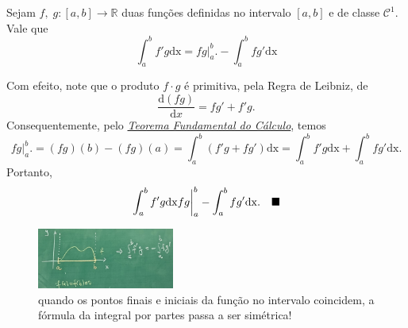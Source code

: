 \documentclass[../analysisII_notes.tex]{subfiles}
\begin{document}
\hypertarget{integration_by_parts}{\begin{theorem*}
		Sejam \(f,\;g:[a, b]\rightarrow \mathbb{R}\) duas funções definidas no intervalo \([a, b]\) e de classe \(\mathcal{C}^{1}\). Vale que
		\[
			\int_{a}^{b}f'g \mathrm{dx} = fg \biggl|_{a}^{b}\biggr. - \int_{a}^{b}fg' \mathrm{dx}
		\]
	\end{theorem*}}
\begin{proof*}
	Com efeito, note que o produto \(f \cdot g\) é primitiva, pela Regra de Leibniz, de
	\[
		\frac{\mathrm{d}(fg)}{\mathrm{d}x} = fg' + f'g.
	\]
	Consequentemente, pelo \hyperlink{ftc}{\textit{Teorema Fundamental do Cálculo}}, temos
	\[
		fg \biggl|_{a}^{b}\biggr. = (fg)(b)-(fg)(a) = \int_{a}^{b}(f'g+fg') \mathrm{dx} = \int_{a}^{b}f'g \mathrm{dx} + \int_{a}^{b}fg' \mathrm{dx}.
	\]
	Portanto,
	\[
		\int_{a}^{b}f'g \mathrm{dx}fg \biggl|_{a}^{b}\biggr. - \int_{a}^{b}fg' \mathrm{dx}. \quad \text{$\blacksquare$}
	\]
\end{proof*}
\begin{figure}[H]
	\begin{center}
		\includegraphics[height=0.4\textheight, width=0.4\textwidth, keepaspectratio]{./Images/integral_by_parts_15.png}
	\end{center}
	\caption{quando os pontos finais e iniciais da função no intervalo coincidem, a fórmula da integral por partes passa a ser simétrica!}
	\label{ibp15}
\end{figure}
\end{document}
